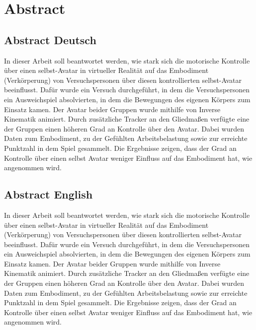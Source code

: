 \chapter*{Abstract}

\section*{Abstract Deutsch}
In dieser Arbeit soll beantwortet werden, wie stark sich die motorische Kontrolle über einen selbst-Avatar in virtueller Realität auf das Embodiment (Verkörperung) von Versuchspersonen über diesen kontrollierten selbst-Avatar beeinflusst. Dafür wurde ein Versuch durchgeführt, in dem die Versuchspersonen ein Ausweichspiel absolvierten, in dem die Bewegungen des eigenen Körpers zum Einsatz kamen. Der Avatar beider Gruppen wurde mithilfe von Inverse Kinematik animiert. Durch zusätzliche Tracker an den Gliedmaßen verfügte eine der Gruppen einen höheren Grad an Kontrolle über den Avatar. Dabei wurden Daten zum Embodiment, zu der Gefühlten Arbeitsbelastung sowie zur erreichte Punktzahl in dem Spiel gesammelt. Die Ergebnisse zeigen, dass der Grad an Kontrolle über einen selbst Avatar weniger Einfluss auf das Embodiment hat, wie angenommen wird.


\section*{Abstract English}
In dieser Arbeit soll beantwortet werden, wie stark sich die motorische Kontrolle über einen selbst-Avatar in virtueller Realität auf das Embodiment (Verkörperung) von Versuchspersonen über diesen kontrollierten selbst-Avatar beeinflusst. Dafür wurde ein Versuch durchgeführt, in dem die Versuchspersonen ein Ausweichspiel absolvierten, in dem die Bewegungen des eigenen Körpers zum Einsatz kamen. Der Avatar beider Gruppen wurde mithilfe von Inverse Kinematik animiert. Durch zusätzliche Tracker an den Gliedmaßen verfügte eine der Gruppen einen höheren Grad an Kontrolle über den Avatar. Dabei wurden Daten zum Embodiment, zu der Gefühlten Arbeitsbelastung sowie zur erreichte Punktzahl in dem Spiel gesammelt. Die Ergebnisse zeigen, dass der Grad an Kontrolle über einen selbst Avatar weniger Einfluss auf das Embodiment hat, wie angenommen wird.

